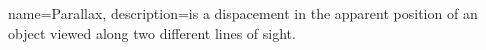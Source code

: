 {
    name=Parallax,
    description={is a dispacement in the apparent position of an object viewed along two different lines of sight.}
}
